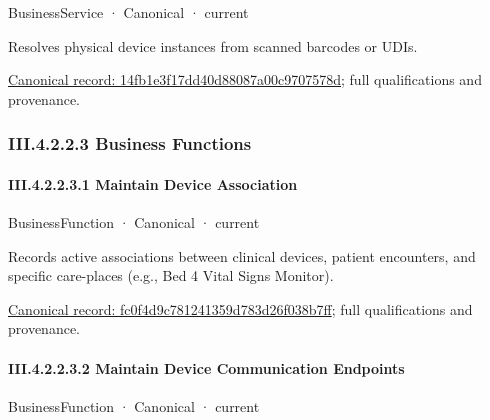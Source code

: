 \label{element:14fb1e3f17dd40d88087a00c9707578d}
{\small BusinessService · Canonical · current}\par

Resolves physical device instances from scanned barcodes or UDIs.


{\footnotesize \href{../../../../../../../continuum/business/business-service/14fb1e3f17dd40d88087a00c9707578d.md}{Canonical record: 14fb1e3f17dd40d88087a00c9707578d}; full qualifications and provenance.}\par
\subsubsection*{III.4.2.2.3 Business Functions}
\label{navigation:III.4.2.2.3}

\paragraph*{III.4.2.2.3.1 Maintain Device Association}
\label{navigation:III.4.2.2.3.1}

\label{element:fc0f4d9c781241359d783d26f038b7ff}
{\small BusinessFunction · Canonical · current}\par

Records active associations between clinical devices, patient encounters, and specific care-places (e.g., Bed 4 Vital Signs Monitor).


{\footnotesize \href{../../../../../../../continuum/business/business-function/fc0f4d9c781241359d783d26f038b7ff.md}{Canonical record: fc0f4d9c781241359d783d26f038b7ff}; full qualifications and provenance.}\par
\paragraph*{III.4.2.2.3.2 Maintain Device Communication Endpoints}
\label{navigation:III.4.2.2.3.2}

\label{element:ab5a7538fbd449ae8214d584b7d53a43}
{\small BusinessFunction · Canonical · current}\par

